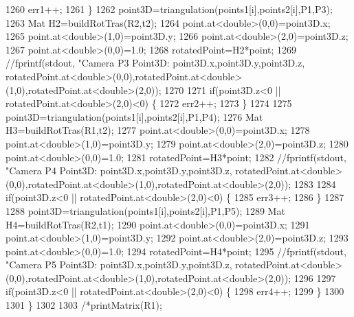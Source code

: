 \begin{DoxyCode}
1260             err1++;
1261         \}
1262         point3D=triangulation(points1[i],points2[i],P1,P3);
1263         Mat H2=buildRotTras(R2,t2);
1264         point.at<\textcolor{keywordtype}{double}>(0,0)=point3D.x;
1265         point.at<\textcolor{keywordtype}{double}>(1,0)=point3D.y;
1266         point.at<\textcolor{keywordtype}{double}>(2,0)=point3D.z;
1267         point.at<\textcolor{keywordtype}{double}>(0,0)=1.0;
1268         rotatedPoint=H2*point;
1269         \textcolor{comment}{//fprintf(stdout, "Camera P3 Point3D: %
       point3D.x,point3D.y,point3D.z, rotatedPoint.at<double>(0,0),rotatedPoint.at<double>(1,0),rotatedPoint.at<double>(2,0));}
1270 
1271         \textcolor{keywordflow}{if}(point3D.z<0 || rotatedPoint.at<\textcolor{keywordtype}{double}>(2,0)<0) \{
1272             err2++;
1273         \}
1274 
1275         point3D=triangulation(points1[i],points2[i],P1,P4);
1276         Mat H3=buildRotTras(R1,t2);
1277         point.at<\textcolor{keywordtype}{double}>(0,0)=point3D.x;
1278         point.at<\textcolor{keywordtype}{double}>(1,0)=point3D.y;
1279         point.at<\textcolor{keywordtype}{double}>(2,0)=point3D.z;
1280         point.at<\textcolor{keywordtype}{double}>(0,0)=1.0;
1281         rotatedPoint=H3*point;
1282         \textcolor{comment}{//fprintf(stdout, "Camera P4 Point3D: %
       point3D.x,point3D.y,point3D.z, rotatedPoint.at<double>(0,0),rotatedPoint.at<double>(1,0),rotatedPoint.at<double>(2,0));}
1283 
1284         \textcolor{keywordflow}{if}(point3D.z<0 || rotatedPoint.at<\textcolor{keywordtype}{double}>(2,0)<0) \{
1285             err3++;
1286         \}
1287 
1288         point3D=triangulation(points1[i],points2[i],P1,P5);
1289         Mat H4=buildRotTras(R2,t1);
1290         point.at<\textcolor{keywordtype}{double}>(0,0)=point3D.x;
1291         point.at<\textcolor{keywordtype}{double}>(1,0)=point3D.y;
1292         point.at<\textcolor{keywordtype}{double}>(2,0)=point3D.z;
1293         point.at<\textcolor{keywordtype}{double}>(0,0)=1.0;
1294         rotatedPoint=H4*point;
1295         \textcolor{comment}{//fprintf(stdout, "Camera P5 Point3D: %
       point3D.x,point3D.y,point3D.z, rotatedPoint.at<double>(0,0),rotatedPoint.at<double>(1,0),rotatedPoint.at<double>(2,0));}
1296 
1297         \textcolor{keywordflow}{if}(point3D.z<0 || rotatedPoint.at<\textcolor{keywordtype}{double}>(2,0)<0) \{
1298             err4++;
1299         \}
1300 
1301     \}
1302 
1303     \textcolor{comment}{/*printMatrix(R1);}

\end{DoxyCode}
